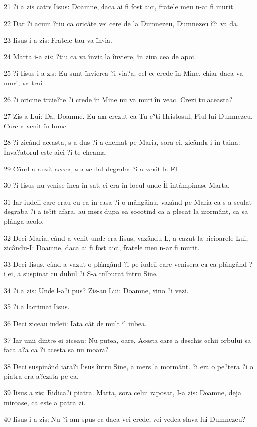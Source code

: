 \par 21 ?i a zis catre Iisus: Doamne, daca ai fi fost aici, fratele meu n-ar fi murit.
\par 22 Dar ?i acum ?tiu ca oricâte vei cere de la Dumnezeu, Dumnezeu î?i va da.
\par 23 Iisus i-a zis: Fratele tau va învia.
\par 24 Marta i-a zis: ?tiu ca va învia la înviere, în ziua cea de apoi.
\par 25 ?i Iisus i-a zis: Eu sunt învierea ?i via?a; cel ce crede în Mine, chiar daca va muri, va trai.
\par 26 ?i oricine traie?te ?i crede în Mine nu va muri în veac. Crezi tu aceasta?
\par 27 Zis-a Lui: Da, Doamne. Eu am crezut ca Tu e?ti Hristosul, Fiul lui Dumnezeu, Care a venit în lume.
\par 28 ?i zicând aceasta, s-a dus ?i a chemat pe Maria, sora ei, zicându-i în taina: Înva?atorul este aici ?i te cheama.
\par 29 Când a auzit aceea, s-a sculat degraba ?i a venit la El.
\par 30 ?i Iisus nu venise înca în sat, ci era în locul unde Îl întâmpinase Marta.
\par 31 Iar iudeii care erau cu ea în casa ?i o mângâiau, vazând pe Maria ca s-a sculat degraba ?i a ie?it afara, au mers dupa ea socotind ca a plecat la mormânt, ca sa plânga acolo.
\par 32 Deci Maria, când a venit unde era Iisus, vazându-L, a cazut la picioarele Lui, zicându-I: Doamne, daca ai fi fost aici, fratele meu n-ar fi murit.
\par 33 Deci Iisus, când a vazut-o plângând ?i pe iudeii care venisera cu ea plângând ?i ei, a suspinat cu duhul ?i S-a tulburat întru Sine.
\par 34 ?i a zis: Unde l-a?i pus? Zis-au Lui: Doamne, vino ?i vezi.
\par 35 ?i a lacrimat Iisus.
\par 36 Deci ziceau iudeii: Iata cât de mult îl iubea.
\par 37 Iar unii dintre ei ziceau: Nu putea, oare, Acesta care a deschis ochii orbului sa faca a?a ca ?i acesta sa nu moara?
\par 38 Deci suspinând iara?i Iisus întru Sine, a mers la mormânt. ?i era o pe?tera ?i o piatra era a?ezata pe ea.
\par 39 Iisus a zis: Ridica?i piatra. Marta, sora celui raposat, I-a zis: Doamne, deja miroase, ca este a patra zi.
\par 40 Iisus i-a zis: Nu ?i-am spus ca daca vei crede, vei vedea slava lui Dumnezeu?
